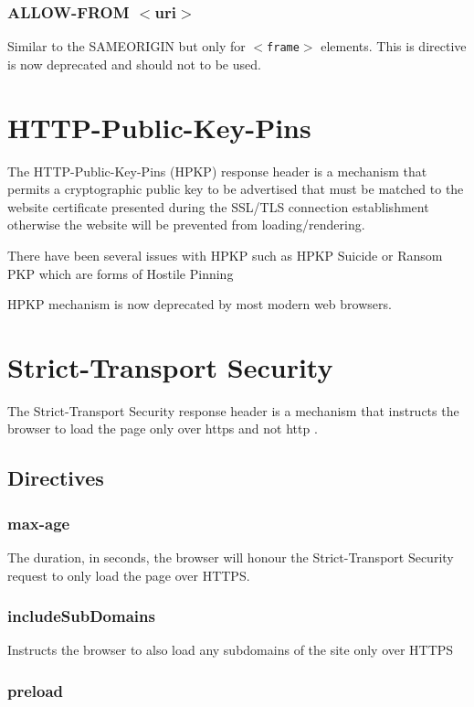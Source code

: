 \documentclass{mscreport}
\begin{document}
\subsubsection{ALLOW-FROM $<$uri$>$}
Similar to the SAMEORIGIN but only for \texttt{$<$frame$>$} elements. This is directive is now deprecated and should not to be used.

\section{HTTP-Public-Key-Pins}
The HTTP-Public-Key-Pins (HPKP) response header is a mechanism that permits a cryptographic public key to be advertised that must be matched to the website certificate presented during the SSL/TLS connection establishment otherwise the website will be prevented from loading/rendering.

There have been several issues with HPKP such as HPKP Suicide \cite{Chen2018-ft,Chuat2021-nf} or Ransom PKP \cite{Chuat2021-nf} which are forms of Hostile Pinning \cite{Evans2018-mi}

\vspace{0.3cm}
\noindent
HPKP mechanism is now deprecated by most modern web browsers.

\newpage

\section{Strict-Transport Security}
The Strict-Transport Security response header is a mechanism that instructs the browser to load the page only over https and not http \cite{Hodges2012-pe}.
\subsection{Directives}
\subsubsection{max-age}
The duration, in seconds, the browser will honour the Strict-Transport Security request to only load the page over HTTPS.

\subsubsection{includeSubDomains}
Instructs the browser to also load any subdomains of the site only over HTTPS

\subsubsection{preload}
\end{document}
